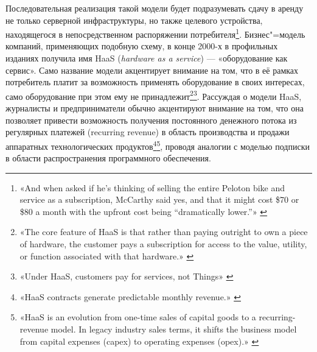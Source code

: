 \documentclass{article}
\let\textitorig\textit
\renewcommand{\textit}[1]{{\fontfamily{cmr}\selectfont \textitorig{#1}}}
\begin{document}
Последовательная реализация такой модели будет подразумевать сдачу в аренду не только серверной инфраструктуры, но также целевого устройства, находящегося в непосредственном распоряжении потребителя\footnote{«And when asked if he’s thinking of selling the entire Peloton bike and service as a subscription, McCarthy said yes, and that it might cost \$70 or \$80 a month with the upfront cost being “dramatically lower.”» \cite{staceyoniotFeatureOfHardwareSubscription2022}}. Бизнес"=модель компаний, применяющих подобную схему, в конце 2000-х в профильных изданиях получила имя HaaS (\textit{hardware as a service}) — «оборудование как сервис». Само название модели акцентирует внимание на том, что в её рамках потребитель платит за возможность применять оборудование в своих интересах, само оборудование при этом ему не принадлежит\footnote{«The core feature of HaaS is that rather than paying outright to own a piece of hardware, the customer pays a subscription for access to the value, utility, or function associated with that hardware.» \cite{hardfinWhatIsHaas2023}}\footnote{«Under HaaS, customers pay for services, not Things» \cite{howHaasWillSaveIot2016}}. Рассуждая о модели HaaS, журналисты и предприниматели обычно акцентируют внимание на том, что она позволяет привести возможность получения постоянного денежного потока из регулярных платежей (recurring revenue) в область производства и продажи аппаратных технологических продуктов\footnote{«HaaS contracts generate predictable monthly revenue.» \cite{howHaasWillSaveIot2016}}\footnote{«HaaS is an evolution from one-time sales of capital goods to a recurring-revenue model. In legacy industry sales terms, it shifts the business model from capital expenses (capex) to operating expenses (opex).» \cite{hardfinWhatIsHaas2023}}, проводя аналогии с моделью подписки в области распространения программного обеспечения.
\end{document}
